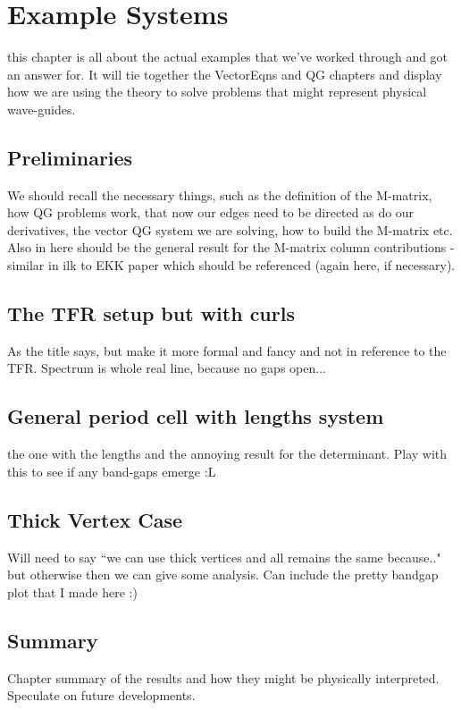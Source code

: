 \chapter{Example Systems} \label{ch:ExampleSystems}
this chapter is all about the actual examples that we've worked through and got an answer for.
It will tie together the VectorEqns and QG chapters and display how we are using the theory to solve problems that might represent physical wave-guides.

\section{Preliminaries}
We should recall the necessary things, such as the definition of the M-matrix, how QG problems work, that now our edges need to be directed as do our derivatives, the vector QG system we are solving, how to build the M-matrix etc.
Also in here should be the general result for the M-matrix column contributions - similar in ilk to EKK paper which should be referenced (again here, if necessary).

\section{The TFR setup but with curls}
As the title says, but make it more formal and fancy and not in reference to the TFR. 
Spectrum is whole real line, because no gaps open...

\section{General period cell with lengths system}
the one with the lengths and the annoying result for the determinant.
Play with this to see if any band-gaps emerge :L

\section{Thick Vertex Case}
Will need to say ``we can use thick vertices and all remains the same because.." but otherwise then we can give some analysis.
Can include the pretty bandgap plot that I made here :)

\section{Summary}
Chapter summary of the results and how they might be physically interpreted.
Speculate on future developments.